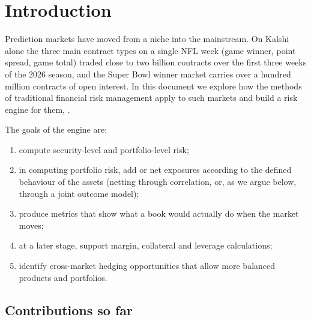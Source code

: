 \section{Introduction}

Prediction markets have moved from a niche into the mainstream. On Kalshi alone the three main contract types on a single NFL week (game winner, point spread, game total) traded close to two billion contracts over the first three weeks of the 2026 season, and the Super Bowl winner market carries over a hundred million contracts of open interest. In this document we explore how the methods of traditional financial risk management apply to such markets and build a risk engine for them, \aname.

The goals of the engine are:
\begin{enumerate}[nosep]
\item compute security-level and portfolio-level risk;
\item in computing portfolio risk, add or net exposures according to the defined behaviour of the assets (netting through correlation, or, as we argue below, through a joint outcome model);
\item produce metrics that show what a book would actually do when the market moves;
\item at a later stage, support margin, collateral and leverage calculations;
\item identify cross-market hedging opportunities that allow more balanced products and portfolios.
\end{enumerate}

\subsection{Contributions so far}

